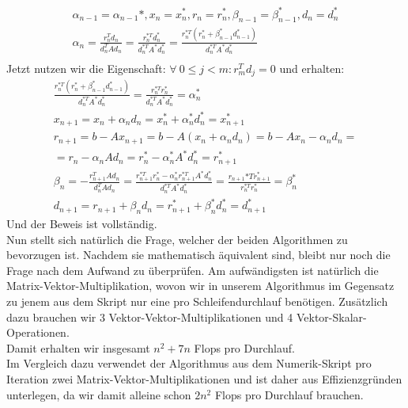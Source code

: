 \begin{align*}
  \alpha_{n-1} = \alpha_{n-1}*, x_n = x_n^*, r_n = r_n^*, \beta_{n-1} = \beta_{n-1}^*, d_n = d_n^* \\
  \alpha_n = \frac{r_n^Td_n}{d_n^TAd_n} = \frac{r_n^{*T}d_n^*}{d_n^{*T}A^*d_n^*} = \frac{r_n^{*T}(r_n^* + \beta_{n-1}^*d_{n-1}^*)}{d_n^{*T}A^*d_n^*} \\
\end{align*}
Jetzt nutzen wir die Eigenschaft: $\forall~ 0 \leq j < m: r_m^Td_j = 0$ und erhalten:
\begin{align*}
  \frac{r_n^{*T}(r_n^* + \beta_{n-1}^*d_{n-1}^*)}{d_n^{*T}A^*d_n^*} = \frac{r_n^{*T}r_n^*}{d_n^{*T}A^*d_n^*} = \alpha_n^* \\
  x_{n+1} = x_n + \alpha_nd_n = x_n^* + \alpha_n^*d_n^* = x_{n+1}^* \\
  r_{n+1} = b - Ax_{n+1} = b - A(x_n + \alpha_nd_n) = b - Ax_n - \alpha_nd_n = \\
  = r_n - \alpha_nAd_n = r_n^* - \alpha_n^*A^*d_n^* = r_{n+1}^* \\
  \beta_n = - \frac{r_{n+1}^TAd_n}{d_n^TAd_n} = \frac{r_{n+1}^{*T}r_n^* - \alpha_n^*r_{n+1}^{*T}A^*d_n^*}{d_n^{*T}A^*d_n^*}
  = \frac{r_{n+1}{*T}r_{n+1}^*}{r_n^{*T}r_n^*} = \beta_n^* \\
  d_{n+1} = r_{n+1} + \beta_nd_n = r_{n+1}^* + \beta_n^*d_n^* = d_{n+1}^*
\end{align*}
Und der Beweis ist vollständig. \\

Nun stellt sich natürlich die Frage, welcher der beiden Algorithmen zu bevorzugen ist.
Nachdem sie mathematisch äquivalent sind, bleibt nur noch die Frage nach dem Aufwand zu überprüfen.
Am aufwändigsten ist natürlich die Matrix-Vektor-Multiplikation, wovon wir in unserem Algorithmus
im Gegensatz zu jenem aus dem Skript nur eine pro Schleifendurchlauf benötigen.
Zusätzlich dazu brauchen wir 3 Vektor-Vektor-Multiplikationen und 4 Vektor-Skalar-Operationen. \\
Damit erhalten wir insgesamt $n^2+7n$ Flops pro Durchlauf. \\
Im Vergleich dazu verwendet der Algorithmus aus dem Numerik-Skript pro Iteration zwei Matrix-Vektor-Multiplikationen
und ist daher aus Effizienzgründen unterlegen, da wir damit alleine schon $2n^2$ Flops pro Durchlauf brauchen. \\

